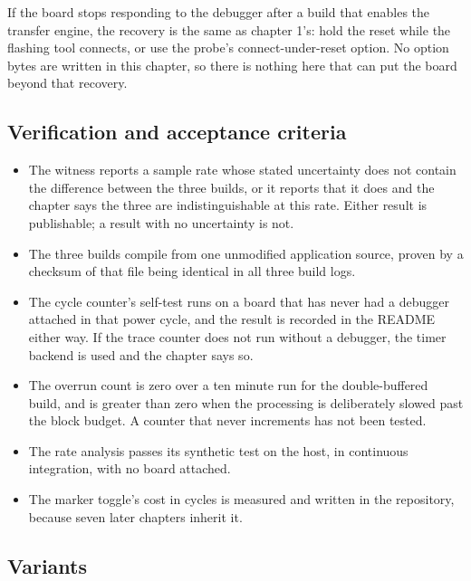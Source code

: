 If the board stops responding to the debugger after a build that enables the
transfer engine, the recovery is the same as chapter 1's: hold the reset while
the flashing tool connects, or use the probe's connect-under-reset option. No
option bytes are written in this chapter, so there is nothing here that can put
the board beyond that recovery.

\subsection*{Verification and acceptance criteria}

\begin{itemize}
\item The witness reports a sample rate whose stated uncertainty does not
contain the difference between the three builds, or it reports that it does and
the chapter says the three are indistinguishable at this rate. Either result is
publishable; a result with no uncertainty is not.
\item The three builds compile from one unmodified application source, proven by
a checksum of that file being identical in all three build logs.
\item The cycle counter's self-test runs on a board that has never had a
debugger attached in that power cycle, and the result is recorded in the README
either way. If the trace counter does not run without a debugger, the timer
backend is used and the chapter says so.
\item The overrun count is zero over a ten minute run for the double-buffered
build, and is greater than zero when the processing is deliberately slowed past
the block budget. A counter that never increments has not been tested.
\item The rate analysis passes its synthetic test on the host, in continuous
integration, with no board attached.
\item The marker toggle's cost in cycles is measured and written in the
repository, because seven later chapters inherit it.
\end{itemize}

\subsection*{Variants}

